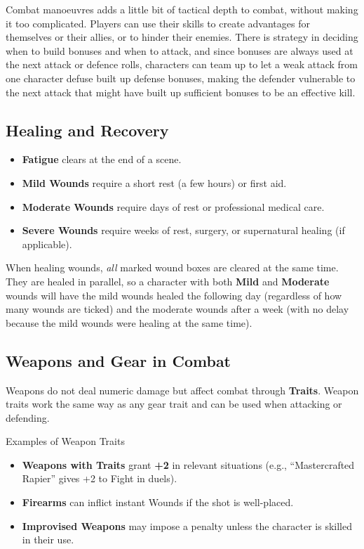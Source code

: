 \begin{multicols}{2}
Combat manoeuvres adds a little bit of tactical depth to combat, without making it too complicated. Players can use their skills to create advantages for themselves or their allies, or to hinder their enemies. There is strategy in deciding when to build bonuses and when to attack, and since bonuses are always used at the next attack or defence rolls, characters can team up to let a weak attack from one character defuse built up defense bonuses, making the defender vulnerable to the next attack that might have built up sufficient bonuses to be an effective kill.


\subsection{Healing and Recovery}\label{core:healing}

\begin{itemize}
    \item \textbf{Fatigue} clears at the end of a scene.
    \item \textbf{Mild Wounds} require a short rest (a few hours) or first aid.
    \item \textbf{Moderate Wounds} require days of rest or professional medical care.
    \item \textbf{Severe Wounds} require weeks of rest, surgery, or supernatural healing (if applicable).
\end{itemize}

When healing wounds, \emph{all} marked wound boxes are cleared at the same time. They are healed in parallel, so a character with both \textbf{Mild} and \textbf{Moderate} wounds will have the mild wounds healed the following day (regardless of how many wounds are ticked) and the moderate wounds after a week (with no delay because the mild wounds were healing at the same time).


\subsection{Weapons and Gear in Combat}
Weapons do not deal numeric damage but affect combat through \textbf{Traits}. Weapon traits work the same way as any gear trait and can be used when attacking or defending.

\begin{Example}{Examples of Weapon Traits}
	\begin{itemize}
    	\item \textbf{Weapons with Traits} grant \textbf{+2} in relevant situations (e.g., “Mastercrafted Rapier” gives +2 to Fight in duels).
	    \item \textbf{Firearms} can inflict instant Wounds if the shot is well-placed.
    	\item \textbf{Improvised Weapons} may impose a penalty unless the character is skilled in their use.
	\end{itemize}
\end{Example}


\end{multicols}

